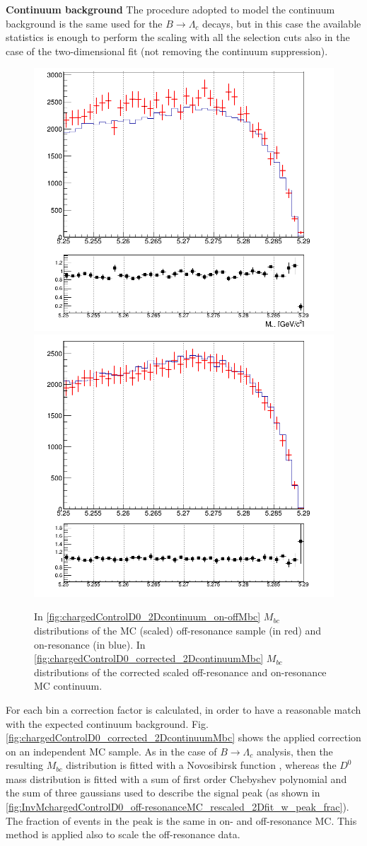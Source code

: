 \noindent \textbf{Continuum background}
\newline
\noindent The procedure adopted to model the continuum background is the same used for the $B \rightarrow \Lambda_c$ decays, but in this case
the available statistics is enough to perform the scaling with all the selection cuts also in the case of the two-dimensional fit (not removing the continuum suppression).

  
 \begin{figure}[H]
 \centering
\subcaptionbox{\label{fig:chargedControlD0_2Dcontinuum_on-offMbc}}
{\includegraphics[width=.45\textwidth]{05-chargedControlSample/figs/on_off_res_chargedControlD0_Mbc.png}}
\subcaptionbox{\label{fig:chargedControlD0_corrected_2DcontinuumMbc}}
{\includegraphics[width=.45\textwidth]{05-chargedControlSample/figs/chargedControlD0_corrected_2DcontinuumMbc.png}}
\caption{In \cref{fig:chargedControlD0_2Dcontinuum_on-offMbc} $M_{bc}$ distributions of the MC (scaled) off-resonance sample (in red) and on-resonance (in blue).  In \cref{fig:chargedControlD0_corrected_2DcontinuumMbc} $M_{bc}$ distributions of the corrected scaled off-resonance and on-resonance MC continuum.}
\end{figure}

\noindent For each bin a correction factor is calculated, in order to have a reasonable match with the expected continuum background. Fig. \ref{fig:chargedControlD0_corrected_2DcontinuumMbc} shows the applied correction on an independent MC sample.
As in the case of $B \rightarrow \Lambda_c$ analysis, then the resulting $M_{bc}$ distribution is fitted with a Novosibirsk function , whereas the $D^0$ mass distribution is fitted with a sum of first order Chebyshev polynomial and the sum of three gaussians used to describe the signal peak (as shown in \cref{fig:InvMchargedControlD0_off-resonanceMC_rescaled_2Dfit_w_peak_frac}). The fraction of events in the peak is the same in on- and off-resonance MC. This method is applied also to scale the off-resonance data.

